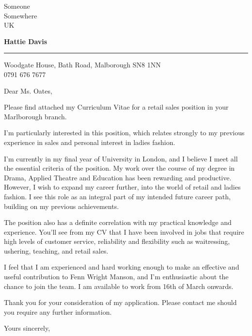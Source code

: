 \documentclass[a4paper]{letter} %
\begin{document}
\signature{Hattie Davis}           %
\longindentation=0pt                       %
\let\raggedleft\raggedright                %
 
\begin{letter}{Someone\\Somewhere\\UK}

\begin{flushleft}
{\large\bf Hattie Davis}
\end{flushleft}
\medskip\hrule height 1pt
\begin{flushright}
\hfill Woodgate House, Bath Road, Malborough SN8 1NN \\
\hfill 0791 676 7677
\end{flushright} 
\vfill %

 
\opening{Dear Ms. Oates,} 
 
\noindent Please find attached my Curriculum Vitae for a retail sales position in your Marlborough branch.
 
\noindent I'm particularly interested in this position, which relates strongly to my previous experience in sales and personal interest in ladies fashion.

\noindent I'm currently in my final year of University in London, and I believe I meet all the essential criteria of the position. My work over the course of my degree in Drama, Applied Theatre and Education has been rewarding and productive. However, I wish to expand my career further, into the world of retail and ladies fashion. I see this role as an integral part of my intended future career path, building on my previous achievements.
 
\noindent The position also has a definite correlation with my practical knowledge and experience. You'll see from my CV that I have been involved in jobs that require high levels of customer service, reliability and flexibility such as waitressing, ushering, teaching, and retail sales.

\noindent I feel that I am experienced and hard working enough to make an effective and useful contribution to Fenn Wright Manson, and I'm enthusiastic about the chance to join the team. I am available to work from 16th of March onwards.

\noindent Thank you for your consideration of my application. Please contact me should you require any further information.
 
\closing{Yours sincerely,} 
 

 

\end{letter}
 
\end{document}
